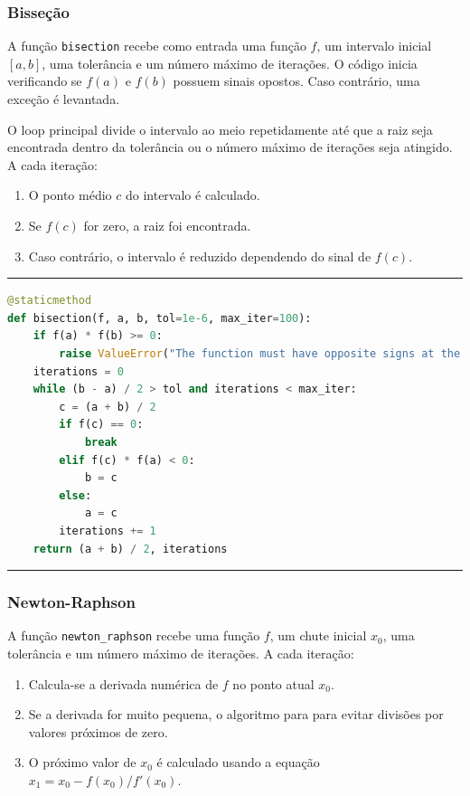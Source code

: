 \subsubsection{Bisseção}

A função \texttt{bisection} recebe como entrada uma função \( f \), um intervalo
inicial \([a, b]\), uma tolerância e um número máximo de iterações. O código
inicia verificando se \( f(a) \) e \( f(b) \) possuem sinais opostos. Caso
contrário, uma exceção é levantada.

O loop principal divide o intervalo ao meio repetidamente até que a raiz seja
encontrada dentro da tolerância ou o número máximo de iterações seja atingido. A
cada iteração:

\begin{enumerate}
	\item O ponto médio \( c \) do intervalo é calculado.
	\item Se \( f(c) \) for zero, a raiz foi encontrada.
	\item Caso contrário, o intervalo é reduzido dependendo do sinal de \( f(c) \).
\end{enumerate}

\hrule
\lstset{style=mystyle}
\begin{lstlisting}[language=Python]
@staticmethod
def bisection(f, a, b, tol=1e-6, max_iter=100):
    if f(a) * f(b) >= 0:
        raise ValueError("The function must have opposite signs at the endpoints.")
    iterations = 0
    while (b - a) / 2 > tol and iterations < max_iter:
        c = (a + b) / 2
        if f(c) == 0:
            break
        elif f(c) * f(a) < 0:
            b = c
        else:
            a = c
        iterations += 1
    return (a + b) / 2, iterations
\end{lstlisting}
\hrule

\subsubsection{Newton-Raphson}

A função \texttt{newton\_raphson} recebe uma função \( f \), um chute inicial \(
x_0 \), uma tolerância e um número máximo de iterações. A cada iteração:

\begin{enumerate}
	\item Calcula-se a derivada numérica de \( f \) no ponto atual \( x_0 \).
	\item Se a derivada for muito pequena, o algoritmo para para evitar divisões por valores próximos de zero.
	\item O próximo valor de \( x_0 \) é calculado usando a equação \( x_1 = x_0 - f(x_0) / f'(x_0) \).
\end{enumerate}

